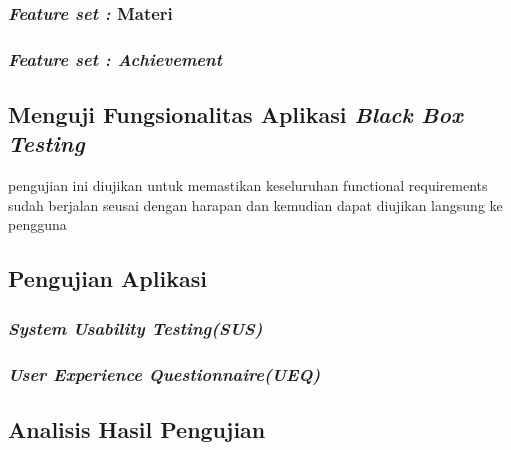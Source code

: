 \subsubsection{\textit{Feature set :} Materi}
\subsubsection{\textit{Feature set : Achievement}}

\subsection{Menguji Fungsionalitas Aplikasi \textit{Black Box Testing}}
pengujian ini diujikan untuk memastikan keseluruhan functional requirements sudah berjalan seusai dengan harapan dan kemudian dapat diujikan langsung ke pengguna
\subsection{Pengujian Aplikasi}
\subsubsection{\textit{System Usability Testing(SUS)}}
\subsubsection{\textit{User Experience Questionnaire(UEQ)}}
\subsection{Analisis Hasil Pengujian}
